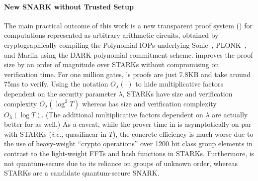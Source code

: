 \paragraph{New SNARK without Trusted Setup}
The main practical outcome of this work is a new transparent proof system () for computations represented as arbitrary arithmetic circuits, obtained by cryptographically compiling the Polynomial IOPs underlying \textsf{Sonic}~\cite{Sonic}, \textsf{PLONK}~\cite{Plonk}, and \textsf{Marlin}\cite{Marlin} using the DARK polynomial commitment scheme.  improves the proof size by an order of magnitude over \textsf{STARK}s without compromising on verification time. For one million gates, 's proofs are just 7.8KB and take around 75ms to verify. Using the notation $O_\lambda(\cdot)$ to hide multiplicative factors dependent on the security parameter $\lambda$, \textsf{STARK}s have size and verification complexity $O_\lambda(\log^2 T)$ whereas  has size and verification complexity $O_\lambda(\log T)$. (The additional multiplicative factors dependent on $\lambda$ are actually better for  as well.) 
As a caveat, while the prover time in  is asymptotically on par with \textsf{STARK}s (\emph{i.e.}, quasilinear in $T$), the concrete efficiency is much worse due to the use of heavy-weight ``crypto operations'' over 1200 bit class group elements in contrast to the light-weight FFTs and hash functions in \textsf{STARK}s. Furthermore,  is not quantum-secure due to its reliance on groups of unknown order, whereas \textsf{STARK}s are a candidate quantum-secure SNARK. 

